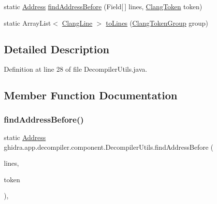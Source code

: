 \begin{DoxyCompactItemize}
\item 
static \mbox{\hyperlink{class_address}{Address}} \mbox{\hyperlink{classghidra_1_1app_1_1decompiler_1_1component_1_1_decompiler_utils_a39ad1c993402acb5e7e67ecf56eccd3b}{find\+Address\+Before}} (Field\mbox{[}$\,$\mbox{]} lines, \mbox{\hyperlink{classghidra_1_1app_1_1decompiler_1_1_clang_token}{Clang\+Token}} token)
\item 
static Array\+List$<$ \mbox{\hyperlink{classghidra_1_1app_1_1decompiler_1_1_clang_line}{Clang\+Line}} $>$ \mbox{\hyperlink{classghidra_1_1app_1_1decompiler_1_1component_1_1_decompiler_utils_ae4adb5edac8a860db65bc92ae0a4f9cd}{to\+Lines}} (\mbox{\hyperlink{classghidra_1_1app_1_1decompiler_1_1_clang_token_group}{Clang\+Token\+Group}} group)
\end{DoxyCompactItemize}


\subsection{Detailed Description}


Definition at line 28 of file Decompiler\+Utils.\+java.



\subsection{Member Function Documentation}
\mbox{\label{classghidra_1_1app_1_1decompiler_1_1component_1_1_decompiler_utils_a39ad1c993402acb5e7e67ecf56eccd3b}} 
\subsubsection{\texorpdfstring{findAddressBefore()}{findAddressBefore()}}
{\footnotesize\ttfamily static \mbox{\hyperlink{class_address}{Address}} ghidra.\+app.\+decompiler.\+component.\+Decompiler\+Utils.\+find\+Address\+Before (\begin{DoxyParamCaption}\item[{Field \mbox{[}$\,$\mbox{]}}]{lines,  }\item[{\mbox{\hyperlink{classghidra_1_1app_1_1decompiler_1_1_clang_token}{Clang\+Token}}}]{token }\end{DoxyParamCaption})\hspace{0.3cm}{\ttfamily [inline]}, {\ttfamily [static]}}



